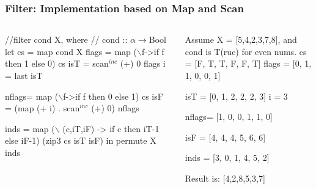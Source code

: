\documentclass{beamer}
\newcommand{\mymath}[1]{$ #1 $}
\newcommand{\myindu}[1]{^{#1}}
\begin{document}
\begin{frame}[fragile,t]
  \frametitle{Filter: Implementation based on Map and Scan}


\begin{columns}
\begin{colorcode}[fontsize=\scriptsize]
//filter cond X, where 
// cond :: \mymath{\alpha\rightarrow}Bool
let cs = map cond X
    flags = map (\mymath{\backslash}f->if f then 1 
                          else 0) cs
    isT   = scan\mymath{\myindu{inc}} (+) 0 flags
    i     = last isT

    nflags= map (\mymath{\backslash}f->if f then 0 
                          else 1) cs
    isF   = (map (+ i) . scan\mymath{\myindu{inc}} (+) 0) 
            nflags

    inds  = map (\mymath{\backslash} (c,iT,iF) -> 
                    if c then iT-1 else iF-1) 
                (zip3 cs isT isF)
in  permute X inds
\end{colorcode}
\begin{colorcode}[fontsize=\scriptsize]
Assume X = [5,4,2,3,7,8], and 
cond is T(rue) for even nums.
cs    = [F, T, T, F, F, T]
flags = [0, 1, 1, 0, 0, 1]

isT   = [0, 1, 2, 2, 2, 3]
i     = 3

nflags= [1, 0, 0, 1, 1, 0]

isF   = [4, 4, 4, 5, 6, 6]


inds  = [3, 0, 1, 4, 5, 2]


Result is: [4,2,8,5,3,7] 
\end{colorcode}
\end{columns}

\end{frame}

\end{document}

